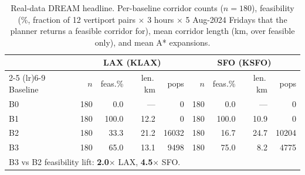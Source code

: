 \begin{table}[t]
\centering
\caption{Real-data DREAM headline. Per-baseline corridor counts ($n=180$), feasibility (\%, fraction of 12 vertiport pairs $\times$ 3 hours $\times$ 5 Aug-2024 Fridays that the planner returns a feasible corridor for), mean corridor length (km, over feasible only), and mean A* expansions.}
\label{tab:headline}
\begin{tabular}{lrrrrrrrr}
\toprule
 & \multicolumn{4}{c}{LAX (KLAX)} & \multicolumn{4}{c}{SFO (KSFO)} \\
\cmidrule(lr){2-5} \cmidrule(lr){6-9}
Baseline & $n$ & feas.\% & len.\,km & pops & $n$ & feas.\% & len.\,km & pops \\
\midrule
B0 & 180 & 0.0 & — & 0 & 180 & 0.0 & — & 0 \\
B1 & 180 & 100.0 & 12.2 & 0 & 180 & 100.0 & 10.9 & 0 \\
B2 & 180 & 33.3 & 21.2 & 16032 & 180 & 16.7 & 24.7 & 10204 \\
B3 & 180 & 65.0 & 13.1 & 9498 & 180 & 75.0 & 8.2 & 4775 \\
\midrule
\multicolumn{9}{l}{\footnotesize B3 vs B2 feasibility lift: \textbf{2.0$\times$} LAX, \textbf{4.5$\times$} SFO.} \\
\bottomrule
\end{tabular}
\end{table}
